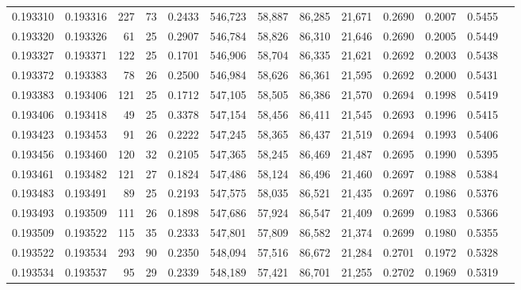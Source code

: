 \begin{tabular}{rrrrrrrrrrrrr}
0.193310 & 0.193316 &   227 &  73 &                                     0.2433 & 546,723 &  58,887 &  86,285 &  21,671 & 0.2690 & 0.2007 & 0.5455 \\
0.193320 & 0.193326 &    61 &  25 &                                     0.2907 & 546,784 &  58,826 &  86,310 &  21,646 & 0.2690 & 0.2005 & 0.5449 \\
0.193327 & 0.193371 &   122 &  25 &                                     0.1701 & 546,906 &  58,704 &  86,335 &  21,621 & 0.2692 & 0.2003 & 0.5438 \\
0.193372 & 0.193383 &    78 &  26 &                                     0.2500 & 546,984 &  58,626 &  86,361 &  21,595 & 0.2692 & 0.2000 & 0.5431 \\
0.193383 & 0.193406 &   121 &  25 &                                     0.1712 & 547,105 &  58,505 &  86,386 &  21,570 & 0.2694 & 0.1998 & 0.5419 \\
0.193406 & 0.193418 &    49 &  25 &                                     0.3378 & 547,154 &  58,456 &  86,411 &  21,545 & 0.2693 & 0.1996 & 0.5415 \\
0.193423 & 0.193453 &    91 &  26 &                                     0.2222 & 547,245 &  58,365 &  86,437 &  21,519 & 0.2694 & 0.1993 & 0.5406 \\
0.193456 & 0.193460 &   120 &  32 &                                     0.2105 & 547,365 &  58,245 &  86,469 &  21,487 & 0.2695 & 0.1990 & 0.5395 \\
0.193461 & 0.193482 &   121 &  27 &                                     0.1824 & 547,486 &  58,124 &  86,496 &  21,460 & 0.2697 & 0.1988 & 0.5384 \\
0.193483 & 0.193491 &    89 &  25 &                                     0.2193 & 547,575 &  58,035 &  86,521 &  21,435 & 0.2697 & 0.1986 & 0.5376 \\
0.193493 & 0.193509 &   111 &  26 &                                     0.1898 & 547,686 &  57,924 &  86,547 &  21,409 & 0.2699 & 0.1983 & 0.5366 \\
0.193509 & 0.193522 &   115 &  35 &                                     0.2333 & 547,801 &  57,809 &  86,582 &  21,374 & 0.2699 & 0.1980 & 0.5355 \\
0.193522 & 0.193534 &   293 &  90 &                                     0.2350 & 548,094 &  57,516 &  86,672 &  21,284 & 0.2701 & 0.1972 & 0.5328 \\
0.193534 & 0.193537 &    95 &  29 &                                     0.2339 & 548,189 &  57,421 &  86,701 &  21,255 & 0.2702 & 0.1969 & 0.5319 \\

\end{tabular}
